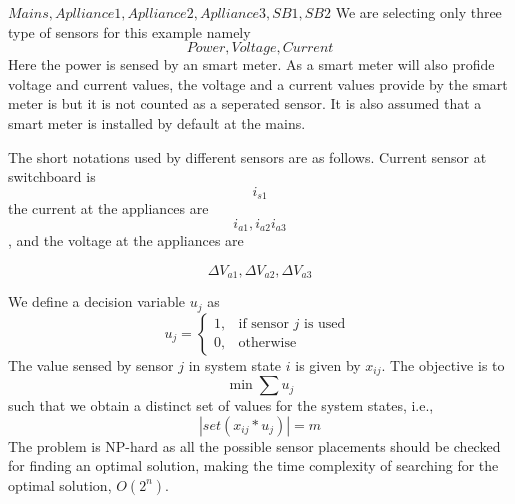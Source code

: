 ${Mains, Aplliance 1, Aplliance 2, Aplliance 3, SB 1, SB 2}$
We are selecting only three type of sensors for this example namely 
$$Power, Voltage, Current$$
Here the power is sensed by an smart meter. As a smart meter will also profide voltage and current values, the voltage and a current values provide by the smart meter is but it is not counted as a seperated sensor. It is also assumed that a smart meter is installed by default at the mains. 

The short notations used by different sensors are as follows. Current sensor at switchboard is 
$$i_{s1}$$ 
the current at the appliances are 
$$i_{a1} , i_{a2}i_{a3}$$, 
and the voltage at the appliances are 

$$\Delta V_{a1}, \Delta V_{a2}, \Delta V_{a3}$$

We define a decision variable $u_j$ as
\begin{equation}
u_{j} = \begin{cases} 1,& \text{if sensor } j \text{ is used } \\
0, & \text{otherwise} \end{cases}
\end{equation}
The value sensed by sensor $j$ in system state $i$ is given by $x_{ij}$.
The objective is to
$$\min \sum u_j$$
such that we obtain a distinct set of values for the system states, i.e.,
$$|set(x_{ij} * u_j)| = m$$
The problem is NP-hard as all the possible sensor placements should be checked for finding an optimal solution, making the time complexity of searching for the optimal solution, $O(2^n)$.
